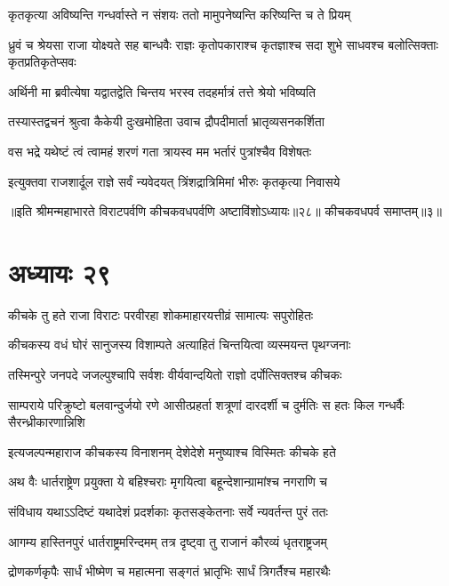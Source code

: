 \twolineshloka
{कृतकृत्या अविष्यन्ति गन्धर्वास्ते न संशयः}
{ततो मामुपनेष्यन्ति करिष्यन्ति च ते प्रियम्}


\threelineshloka
{ध्रुवं च श्रेयसा राजा योक्ष्यते सह बान्धवैः}
{राज्ञः कृतोपकाराश्च कृतज्ञाश्च सदा शुभे}
{साधवश्च बलोत्सिक्ताः कृतप्रतिकृतेप्सवः}


\twolineshloka
{अर्थिनी मा ब्रवीत्येषा यद्वातद्वेति चिन्तय}
{भरस्व तदहर्मात्रं तत्ते श्रेयो भविष्यति}



\twolineshloka
{तस्यास्तद्वचनं श्रुत्वा कैकेयी दुःखमोहिता}
{उवाच द्रौपदीमार्ता भ्रातृव्यसनकर्शिता}


\twolineshloka
{वस भद्रे यथेष्टं त्वं त्वामहं शरणं गता}
{त्रायस्व मम भर्तारं पुत्रांश्चैव विशेषतः}


\twolineshloka
{इत्युक्तवा राजशार्दूल राज्ञे सर्वं न्यवेदयत्}
{त्रिंशद्रात्रिमिमां भीरुः कृतकृत्या निवासये}

॥इति श्रीमन्महाभारते विराटपर्वणि कीचकवधपर्वणि अष्टाविंशोऽध्यायः॥२८॥ कीचकवधपर्व समाप्तम्॥३॥

\chapter{अध्यायः २९}

\twolineshloka
{कीचके तु हते राजा विराटः परवीरहा}
{शोकमाहारयत्तीव्रं सामात्यः सपुरोहितः}


\twolineshloka
{कीचकस्य वधं घोरं सानुजस्य विशाम्पते}
{अत्याहितं चिन्तयित्वा व्यस्मयन्त पृथग्जनाः}


\twolineshloka
{तस्मिन्पुरे जनपदे जजल्पुश्चापि सर्वशः}
{वीर्यवान्दयितो राज्ञो दर्पोत्सिक्तश्च कीचकः}


\threelineshloka
{साम्पराये परिक्रुष्टो बलवान्दुर्जयो रणे}
{आसीत्प्रहर्ता शत्रूणां दारदर्शी च दुर्मतिः}
{स हतः किल गन्धर्वैः सैरन्ध्रीकारणान्निशि}


\twolineshloka
{इत्यजल्पन्महाराज कीचकस्य विनाशनम्}
{देशेदेशे मनुष्याश्च विस्मितः कीचके हते}


\twolineshloka
{अथ वैः धार्तराष्ट्रेण प्रयुक्ता ये बहिश्चराः}
{मृगयित्वा बहून्देशान्ग्रामांश्च नगराणि च}


\twolineshloka
{संविधाय यथाऽऽदिष्टं यथादेशं प्रदर्शकाः}
{कृतसङ्केतनाः सर्वे न्यवर्तन्त पुरं ततः}


\twolineshloka
{आगम्य हास्तिनपुरं धार्तराष्ट्रमरिन्दमम्}
{तत्र दृष्ट्वा तु राजानं कौरव्यं धृतराष्ट्रजम्}


\twolineshloka
{द्रोणकर्णकृपैः सार्धं भीष्मेण च महात्मना}
{सङ्गतं भ्रातृभिः सार्धं त्रिगर्तैश्च महारथैः}


